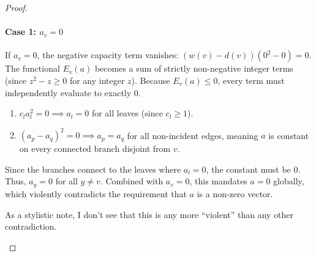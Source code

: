 \documentclass[12pt]{article}
\newcommand{\review}[1]{\begin{reviewbox}#1\end{reviewbox}}
\begin{document}
\begin{proof}
\paragraph{Case 1: $a_v = 0$} 
If $a_v = 0$, the negative capacity term vanishes: $(w(v) - d(v))(0^2 - 0) = 0$. 
The functional $E_v(a)$ becomes a sum of strictly non-negative integer terms (since $z^2 - z \ge 0$ for any integer $z$). 
Because $E_v(a) \le 0$, every term must independently evaluate to exactly $0$.
\begin{enumerate}
    \item $c_l a_l^2 = 0 \implies a_l = 0$ for all leaves (since $c_l \ge 1$).
    \item $(a_p - a_q)^2 = 0 \implies a_p = a_q$ for all non-incident edges, meaning $a$ is constant on every connected branch disjoint from $v$.
\end{enumerate}
Since the branches connect to the leaves where $a_l = 0$, the constant must be $0$. Thus, $a_y = 0$ for all $y \ne v$. 
Combined with $a_v = 0$, this mandates $a = 0$ globally, which violently contradicts the requirement that $a$ is a non-zero vector.
\review{As a stylistic note, I don't see that this is any more ``violent'' than any other contradiction.}


\end{proof}
\end{document}
